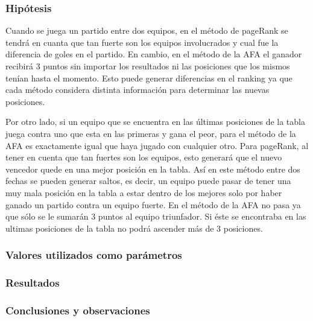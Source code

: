 		\subsubsection*{Hipótesis} 
		Cuando se juega un partido entre dos equipos, en el método de pageRank se tendrá en cuanta que tan fuerte son los equipos involucrados y cual fue la diferencia de goles en el partido. En cambio, en el método de la AFA el ganador recibirá 3 puntos sin importar los resultados ni las posiciones que los mismos tenían hasta el momento. Esto puede generar diferencias en el ranking ya que cada método considera distinta información para determinar las nuevas posiciones. 
		
		Por otro lado, si un equipo que se encuentra en las últimas posiciones de la tabla juega contra uno que esta en las primeras y gana el peor, para el método de la AFA es exactamente igual que haya jugado con cualquier otro. Para pageRank, al tener en cuenta que tan fuertes son los equipos, esto generará que el nuevo vencedor quede en una mejor posición en la tabla. Así en este método entre dos fechas se pueden generar saltos, es decir, un equipo puede pasar de tener una muy mala posición en la tabla a estar dentro de los mejores solo por haber ganado un partido contra un equipo fuerte. En el método de la AFA no pasa ya que sólo se le sumarán 3 puntos al equipo triunfador. Si éste se encontraba en las ultimas posiciones de la tabla no podrá ascender más de 3 posiciones. 		

		\subsubsection*{Valores utilizados como parámetros} 

		\subsubsection*{Resultados}

		\subsubsection*{Conclusiones y observaciones} 

